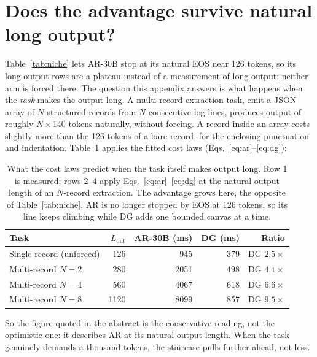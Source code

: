 \section{Does the advantage survive natural long output?}
\label{app:forced}

Table~\ref{tab:niche} lets AR-30B stop at its natural EOS near 126
tokens, so its long-output rows are a plateau instead of a
measurement of long output; neither arm is forced there. The question
this appendix answers is what happens when the \emph{task} makes the
output long. A multi-record extraction task, emit a JSON array of
$N$ structured records from $N$ consecutive log lines, produces
output of roughly $N \times 140$ tokens naturally, without forcing.
A record inside an array costs slightly more than the 126 tokens of a
bare record, for the enclosing punctuation and indentation.
Table~\ref{tab:forced} applies the fitted cost laws
(Eqs.~\ref{eq:ar}--\ref{eq:dg}):

\begin{table}[ht!]
\centering
\caption{What the cost laws predict when the task itself makes output
long. Row 1 is measured; rows 2--4 apply Eqs.~\ref{eq:ar}--\ref{eq:dg}
at the natural output length of an $N$-record extraction. The
advantage grows here, the opposite of
Table~\ref{tab:niche}. AR is no longer stopped by EOS at
126 tokens, so its line keeps climbing while DG adds one bounded
canvas at a time.}
\label{tab:forced}
\begin{tabular}{@{}lrrrr@{}}
\toprule
Task & $L_{\mathrm{out}}$ & AR-30B (ms) & DG (ms) & Ratio \\
\midrule
Single record (unforced) & 126 & 945 & 379 & DG $2.5\times$ \\
Multi-record $N{=}2$ & 280 & 2051 & 498 & DG $4.1\times$ \\
Multi-record $N{=}4$ & 560 & 4067 & 618 & DG $6.6\times$ \\
Multi-record $N{=}8$ & 1120 & 8099 & 857 & DG $9.5\times$ \\
\bottomrule
\end{tabular}
\end{table}

So the figure quoted in the abstract is the conservative
reading, not the optimistic one: it describes AR at its natural output
length. When the task genuinely demands a thousand tokens, the
staircase pulls further ahead, not less.
